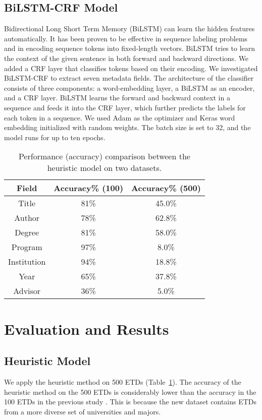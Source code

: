 \documentclass{article}
\begin{document}
\subsection{BiLSTM-CRF Model}
Bidirectional Long Short Term Memory (BiLSTM) can learn the hidden features automatically.
It has been proven to be effective in sequence labeling problems \cite{dke-wu_reshad} and in encoding sequence tokens into fixed-length vectors. BiLSTM tries to learn the context of the given sentence in both forward and backward directions. We added a CRF layer that classifies tokens based on their encoding. We investigated BiLSTM-CRF to extract seven metadata fields. The architecture of the classifier consists of three components: a word-embedding layer, a BiLSTM as an encoder, and a CRF layer. BiLSTM learns the forward and backward context in a sequence and feeds it into the CRF layer, which further predicts the labels for each token in a sequence. We used Adam as the optimizer and Keras word embedding initialized with random weights. The batch size is set to 32, and the model runs for up to ten epochs. 

\begin{table}
    \centering\small 
    \caption{Performance (accuracy) comparison between the heuristic model on two datasets.}
    \begin{tabular}{c|c|c}
    \toprule
      \textbf{Field} & {\bf Accuracy\% (100)} & {\bf Accuracy\% (500)} \\
     \midrule
     {Title} & {81\%}  & {45.0\%} \\
     \midrule
      {Author} & {78\%} & {62.8\%} \\
     \midrule
      {Degree} & {81\%} & {58.0\%}\\
     \midrule
      {Program} & {97\%} & {8.0\%} \\
     \midrule
      {Institution} & {94\%} & {18.8\%} \\
     \midrule
      {Year} & {65\%} & {37.8\%} \\
     \midrule
     {Advisor} & {36\%} & {5.0\%} \\
     \bottomrule
    \end{tabular}
    \label{tab:rules2}
\end{table}

\section{Evaluation and Results}
\subsection{Heuristic Model}
We apply the heuristic method \cite{choudhury-jcdl2020} on 500 ETDs (Table~\ref{tab:rules2}). The accuracy of the heuristic method on the 500 ETDs is considerably lower than the accuracy in the 100 ETDs in the previous study \cite{choudhury-jcdl2020}. This is because the new dataset contains ETDs from a more diverse set of universities and majors.
\end{document}
